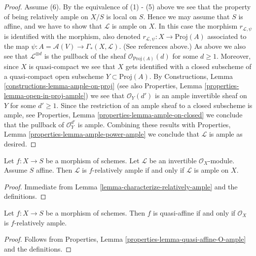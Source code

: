 \begin{proof}
\medskip\noindent
Assume (6). By the equivalence of (1) - (5) above we see that the
property of being relatively ample on $X/S$ is local on $S$. Hence
we may assume that $S$ is affine, and we have to show that
$\mathcal{L}$ is ample on $X$. In this case the morphism
$r_{\mathcal{L}, \psi}$ is identified with the morphism, also denoted
$r_{\mathcal{L}, \psi} : X \to \text{Proj}(A)$ associated to the map
$\psi : A = \mathcal{A}(V) \to \Gamma_*(X, \mathcal{L})$.
(See references above.) As above we also see that
$\mathcal{L}^{\otimes d}$ is the pullback of the sheaf
$\mathcal{O}_{\text{Proj}(A)}(d)$ for some $d \geq 1$.
Moreover, since $X$ is quasi-compact we
see that $X$ gets identified with a closed subscheme of a
quasi-compact open subscheme $Y \subset \text{Proj}(A)$.
By
Constructions, Lemma
\ref{constructions-lemma-ample-on-proj}
(see also
Properties, Lemma
\ref{properties-lemma-open-in-proj-ample})
we see that $\mathcal{O}_Y(d')$ is an ample invertible sheaf on
$Y$ for some $d' \geq 1$. Since the restriction of an ample
sheaf to a closed subscheme is ample, see
Properties, Lemma
\ref{properties-lemma-ample-on-closed}
we conclude that the pullback of
$\mathcal{O}_Y^{d'}$ is ample. Combining these results with
Properties, Lemma
\ref{properties-lemma-ample-power-ample}
we conclude that $\mathcal{L}$ is ample as desired.
\end{proof}

\begin{lemma}
\label{lemma-ample-over-affine}
Let $f : X \to S$ be a morphism of schemes.
Let $\mathcal{L}$ be an invertible $\mathcal{O}_X$-module.
Assume $S$ affine.
Then $\mathcal{L}$ is $f$-relatively ample if and only
if $\mathcal{L}$ is ample on $X$.
\end{lemma}

\begin{proof}
Immediate from Lemma \ref{lemma-characterize-relatively-ample}
and the definitions.
\end{proof}

\begin{lemma}
\label{lemma-quasi-affine-O-ample}
Let $f : X \to S$ be a morphism of schemes. Then $f$ is quasi-affine
if and only if $\mathcal{O}_X$ is $f$-relatively ample.
\end{lemma}

\begin{proof}
Follows from Properties, Lemma \ref{properties-lemma-quasi-affine-O-ample}
and the definitions.
\end{proof}

